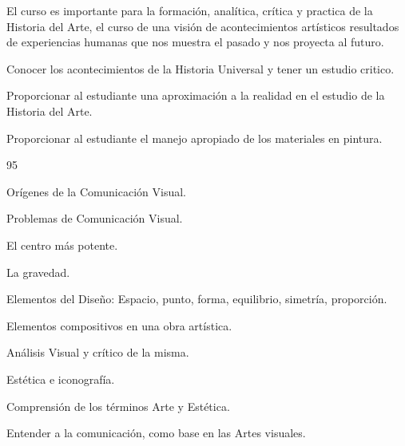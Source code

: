 \begin{syllabus}


\begin{justification}
El curso es importante para la formación, analítica, crítica y practica de la Historia del Arte, el curso de una visión de acontecimientos artísticos resultados de experiencias humanas que nos muestra el pasado y nos proyecta al futuro.
\end{justification}

\begin{goals}
\item Conocer los acontecimientos de la Historia Universal y tener un estudio critico.
\item Proporcionar al estudiante una aproximación a la realidad en el estudio de la Historia del Arte.
\item Proporcionar al estudiante el manejo apropiado de los materiales en pintura.
\end{goals}

\begin{outcomes}
\end{outcomes}

\begin{unit}{}{}{9}{5}
\begin{topics}
	\item Orígenes de la Comunicación Visual.
	\item Problemas de Comunicación Visual.
	\item El centro más potente.
	\item La gravedad.
	\item Elementos del Diseño: Espacio, punto, forma, equilibrio, simetría, proporción.
	\item Elementos compositivos en una obra artística.
	\item Análisis Visual y crítico de la misma.
	\item Estética e iconografía.
\end{topics}
\begin{unitgoals}
	\item Comprensión de los términos Arte y Estética.
	\item Entender a la comunicación, como base en las Artes visuales.

\end{unitgoals}
\end{unit}


\end{syllabus}
